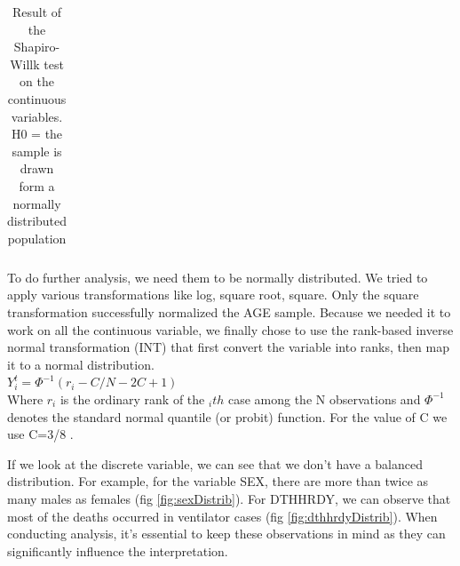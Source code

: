 \documentclass[a4paper, 11pt]{article}
\begin{document}
\begin{multicols}{2}
\begin{table}[H]
\begin{center}
\begin{tabular}{ |c|c|c|c|c|c| }
\end{tabular}
\end{center}
\caption{Result of the Shapiro-Willk test on the continuous variables. H0 = the sample is drawn form a normally distributed population}
\label{tab:swNum}
\end{table}
To do further analysis, we need them to be normally distributed. 
We tried to apply various transformations like log, square root, square. 
Only the square transformation successfully normalized the AGE sample. 
Because we needed it to work on all the continuous variable, we finally chose to use the rank-based inverse normal transformation (INT) that first convert the variable into ranks, then map it to a normal distribution. 
\\
$ Y^t_{i}=  \Phi^{-1}(r_i-C/N-2C+1) $ %
\\
Where $r_i$ is the ordinary rank of the $_ith$ case among the N observations and $\Phi^{-1}$ denotes the standard normal quantile (or probit) function.
For the value of C we use C=3/8 \citep{beasley2009rank}. %

If we look at the discrete variable, we can see that we don't have a balanced distribution. 
For example, for the variable SEX, there are more than twice as many males as females (fig \ref{fig:sexDistrib}). 
For DTHHRDY, we can observe that most of the deaths occurred in ventilator cases (fig \ref{fig:dthhrdyDistrib}). 
When conducting analysis, it's essential to keep these observations in mind as they can significantly influence the interpretation. 


\end{multicols}
\end{document}
